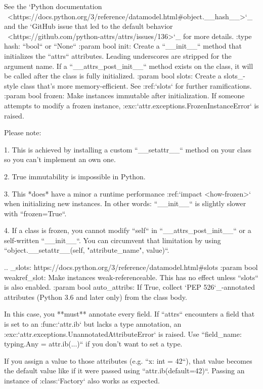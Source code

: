 \begin{DoxyVerb}
    See the `Python documentation \
    <https://docs.python.org/3/reference/datamodel.html#object.__hash__>`_
    and the `GitHub issue that led to the default behavior \
    <https://github.com/python-attrs/attrs/issues/136>`_ for more details.
:type hash: ``bool`` or ``None``
:param bool init: Create a ``__init__`` method that initializes the
    ``attrs`` attributes.  Leading underscores are stripped for the
    argument name.  If a ``__attrs_post_init__`` method exists on the
    class, it will be called after the class is fully initialized.
:param bool slots: Create a slots_-style class that's more
    memory-efficient.  See :ref:`slots` for further ramifications.
:param bool frozen: Make instances immutable after initialization.  If
    someone attempts to modify a frozen instance,
    :exc:`attr.exceptions.FrozenInstanceError` is raised.

    Please note:

        1. This is achieved by installing a custom ``__setattr__`` method
           on your class so you can't implement an own one.

        2. True immutability is impossible in Python.

        3. This *does* have a minor a runtime performance :ref:`impact
           <how-frozen>` when initializing new instances.  In other words:
           ``__init__`` is slightly slower with ``frozen=True``.

        4. If a class is frozen, you cannot modify ``self`` in
           ``__attrs_post_init__`` or a self-written ``__init__``. You can
           circumvent that limitation by using
           ``object.__setattr__(self, "attribute_name", value)``.

    ..  _slots: https://docs.python.org/3/reference/datamodel.html#slots
:param bool weakref_slot: Make instances weak-referenceable.  This has no
    effect unless ``slots`` is also enabled.
:param bool auto_attribs: If True, collect `PEP 526`_-annotated attributes
    (Python 3.6 and later only) from the class body.

    In this case, you **must** annotate every field.  If ``attrs``
    encounters a field that is set to an :func:`attr.ib` but lacks a type
    annotation, an :exc:`attr.exceptions.UnannotatedAttributeError` is
    raised.  Use ``field_name: typing.Any = attr.ib(...)`` if you don't
    want to set a type.

    If you assign a value to those attributes (e.g. ``x: int = 42``), that
    value becomes the default value like if it were passed using
    ``attr.ib(default=42)``.  Passing an instance of :class:`Factory` also
    works as expected.


\end{DoxyVerb}
